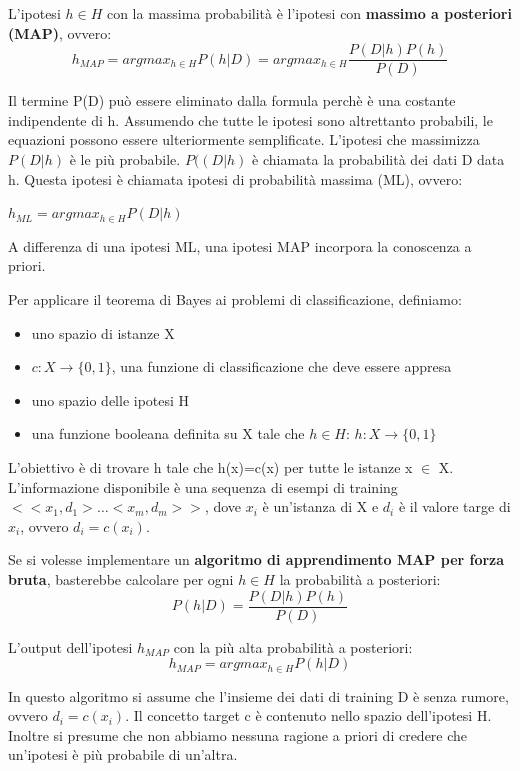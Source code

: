 \documentclass[a4paper]{extarticle}
\begin{document}
L'ipotesi $h\in H$ con la massima probabilità è l'ipotesi con \textbf{massimo a posteriori (MAP)}, ovvero:
\begin{equation*}
h_{MAP} = arg  max_{h \in H} P (h|D) = arg  max_{h \in H} \dfrac{P(D|h)P(h)}{P(D)}
\end{equation*} 

Il termine P(D) può essere eliminato dalla formula perchè è una costante indipendente di h. Assumendo che tutte le ipotesi sono altrettanto probabili, le equazioni possono essere ulteriormente semplificate. L'ipotesi che massimizza $P(D|h)$ è le più probabile. $P((D|h)$ è chiamata la probabilità dei dati D data h. Questa ipotesi è chiamata ipotesi di probabilità massima (ML), ovvero:
\begin{center}
$h_{ML} = arg max_{h \in H} P(D|h)$
\end{center} 

A differenza di una ipotesi ML, una ipotesi MAP incorpora la conoscenza a priori.

Per applicare il teorema di Bayes ai problemi di classificazione, definiamo:
\begin{itemize}
\item uno spazio di istanze X
\item $c: X \rightarrow \{0,1\}$, una funzione di classificazione che deve essere appresa
\item uno spazio delle ipotesi H
\item una funzione booleana definita su X tale che $h \in H$: $h : X \rightarrow \{0,1\}$
\end{itemize}

L'obiettivo è di trovare h tale che h(x)=c(x) per tutte le istanze x $\in$ X. L'informazione disponibile è una sequenza di esempi di training $<<x_1,d_1>\dots <x_m,d_m>>$, dove $x_i$ è un'istanza di X e $d_i$ è il valore targe di $x_i$, ovvero $d_i = c(x_i)$.

Se si volesse implementare un \textbf{algoritmo di apprendimento MAP per forza bruta}, basterebbe calcolare per ogni $h \in H$ la probabilità a posteriori:
\begin{equation*}
P(h|D) = \dfrac{P(D|h)P(h)}{P(D)}
\end{equation*} 

L'output dell'ipotesi $h_{MAP}$ con la più alta probabilità a posteriori:
\begin{equation*}
h_{MAP} = arg max_{h \in H} P(h|D)
\end{equation*}

In questo algoritmo si assume che l'insieme dei dati di training D è senza rumore, ovvero $d_i = c(x_i)$. Il concetto target c è contenuto nello spazio dell'ipotesi H. Inoltre si presume che non abbiamo nessuna ragione a priori di credere che un'ipotesi è più probabile di un'altra.
\end{document}
